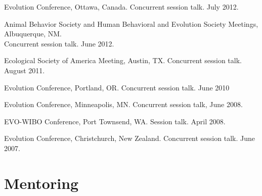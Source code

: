 \documentclass[11pt]{article}
\begin{document}
\begin{compactlist}
  \item Evolution Conference, Ottawa, Canada. Concurrent session talk. July 2012.
  \item Animal Behavior Society and Human Behavioral and Evolution Society Meetings, Albuquerque, NM.  \\
    Concurrent session talk.  June 2012.
  \item Ecological Society of America Meeting, Austin, TX. Concurrent session talk. August 2011.
  \item Evolution Conference, Portland, OR. Concurrent session talk. June 2010
  \item Evolution Conference, Minneapolis, MN. Concurrent session talk, June 2008.
  \item EVO-WIBO Conference, Port Townsend, WA. Session talk. April 2008. 
  \item Evolution Conference, Christchurch, New Zealand. Concurrent session talk. June 2007. 
  \end{compactlist}
  
  \section{Mentoring}
\end{document}
